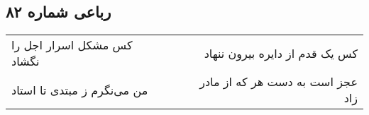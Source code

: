 \begin{center}
\section*{رباعی شماره ۸۲}
\label{sec:sh082}
\begin{longtable}{l p{0.5cm} r}
کس مشکل اسرار اجل را نگشاد
&&
کس یک قدم از دایره بیرون ننهاد
\\
من می‌نگرم ز مبتدی تا استاد
&&
عجز است به دست هر که از مادر زاد
\\
\end{longtable}
\end{center}

